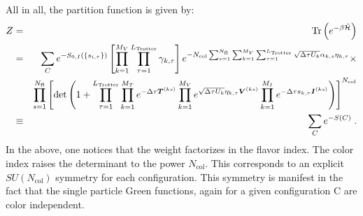 All in all,   the partition function is given by:
\begin{eqnarray}
    Z &=& \mathop{\mathrm{Tr}}{  \left( e^{-\beta \hat{\mathcal{H}} }\right) }\nonumber\\
    &=&   \sum_{C}   e^{-S_{0,I} \left( \left\{ s_{i,\tau} \right\}  \right) }     \left[ \prod_{k=1}^{M_V} \prod_{\tau=1}^{L_{\mathrm{Trotter}}} \gamma_{k,\tau} \right] 
    e^{- N_{\mathrm{col}}\sum_{s=1}^{N_{\mathrm{fl}}} \sum_{k=1}^{M_V} \sum_{\tau = 1}^{L_{\mathrm{Trotter}}}\sqrt{\Delta \tau U_k}  \alpha_{k,s} \eta_{k,\tau} } 
  \times   \nonumber \\
  &\quad&
      \prod_{s=1}^{N_{\mathrm{fl}}}\left[\det\left(  1 + 
     \prod_{\tau=1}^{L_{\mathrm{Trotter}}}   \prod_{k=1}^{M_T}   e^{-\Delta \tau {\bm T}^{(ks)}}  
    \prod_{k=1}^{M_V}   e^{  \sqrt{ \Delta \tau  U_k} \eta_{k,\tau} {\bm V}^{(ks)} }   \prod_{k=1}^{M_I}   e^{  -\Delta \tau s_{k,\tau}  {\bm I}^{(ks)}}  
     \right) \right]^{N_{\mathrm{col}}}  \nonumber \\ 
     & \equiv&  \sum_{C} e^{-S(C) }\;.
\end{eqnarray}
In the above, one notices that the weight factorizes in  the flavor index. The color index raises the determinant to the power $N_{\mathrm{col}}$. This corresponds to  an explicit $SU(N_{\mathrm{col}})$ symmetry   for each  configuration. This symmetry is manifest in the fact that the single particle  Green functions, again for a given  configuration C are color independent. 

